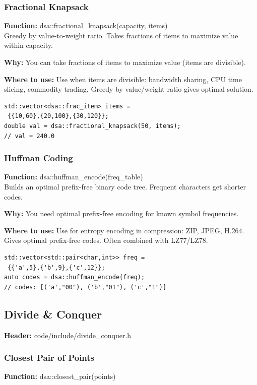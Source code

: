 \documentclass[11pt]{article}
\begin{document}
\subsubsection{Fractional Knapsack}
\textbf{Function:} dsa::fractional\_knapsack(capacity, items)\\

Greedy by value-to-weight ratio. Takes fractions of items to maximize value within capacity.

\textbf{Why:} You can take fractions of items to maximize value (items are divisible). \par \textbf{Where to use:} Use when items are divisible: bandwidth sharing, CPU time slicing, commodity trading. Greedy by value/weight ratio gives optimal solution.

\begin{lstlisting}
std::vector<dsa::frac_item> items =
 {{10,60},{20,100},{30,120}};
double val = dsa::fractional_knapsack(50, items);
// val = 240.0
\end{lstlisting}

\subsubsection{Huffman Coding}
\textbf{Function:} dsa::huffman\_encode(freq\_table)\\

Builds an optimal prefix-free binary code tree. Frequent characters get shorter codes.

\textbf{Why:} You need optimal prefix-free encoding for known symbol frequencies. \par \textbf{Where to use:} Use for entropy encoding in compression: ZIP, JPEG, H.264. Gives optimal prefix-free codes. Often combined with LZ77/LZ78.

\begin{lstlisting}
std::vector<std::pair<char,int>> freq =
 {{'a',5},{'b',9},{'c',12}};
auto codes = dsa::huffman_encode(freq);
// codes: [('a',"00"), ('b',"01"), ('c',"1")]
\end{lstlisting}

\subsection{Divide \& Conquer}
\textbf{Header:} code/include/divide\_conquer.h

\subsubsection{Closest Pair of Points}
\textbf{Function:} dsa::closest\_pair(points)\\
\end{document}
